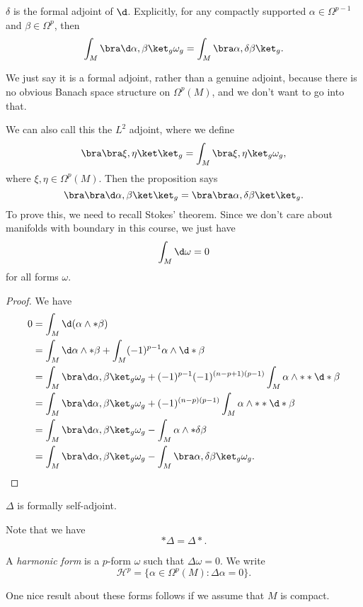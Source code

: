 \documentclass[a4paper]{article}
\begin{document}
\begin{prop}
  $\delta$ is the formal adjoint of $\d$. Explicitly, for any compactly supported $\alpha \in \Omega^{p - 1}$ and $\beta \in \Omega^p$, then
  \[
    \int_M \bra \d \alpha, \beta\ket_g \omega_g = \int_M \bra \alpha, \delta \beta\ket_g.
  \]
\end{prop}
We just say it is a formal adjoint, rather than a genuine adjoint, because there is no obvious Banach space structure on $\Omega^p(M)$, and we don't want to go into that.

We can also call this the $L^2$ adjoint, where we define
\[
  \bra \bra \xi, \eta\ket\ket_g = \int_M \bra \xi, \eta\ket_g \omega_g,
\]
where $\xi, \eta \in \Omega^p(M)$. Then the proposition says
\[
  \bra\bra \d \alpha, \beta\ket\ket_g = \bra \bra \alpha, \delta \beta \ket\ket_g.
\]
To prove this, we need to recall Stokes' theorem. Since we don't care about manifolds with boundary in this course, we just have
\[
  \int_M \d \omega = 0
\]
for all forms $\omega$.
\begin{proof}
  We have
  \begin{align*}
    0 &= \int_M \d (\alpha \wedge *\beta)\\
    &= \int_M \d \alpha \wedge *\beta + \int_M (-1)^{p - 1} \alpha \wedge \d * \beta\\
    &= \int_M \bra \d \alpha, \beta \ket_g \omega_g + (-1)^{p - 1} (-1)^{(n - p + 1)(p - 1)}\int_M \alpha \wedge **\d* \beta\\
    &= \int_M \bra \d \alpha, \beta \ket_g \omega_g + (-1)^{(n - p)(p - 1)} \int_M \alpha \wedge **\d* \beta\\
    &= \int_M \bra \d \alpha, \beta\ket_g \omega_g - \int_M \alpha \wedge * \delta \beta\\
    &= \int_M \bra \d \alpha, \beta\ket_g \omega_g - \int_M \bra \alpha, \delta \beta\ket_g \omega_g.
  \end{align*}
\end{proof}

\begin{cor}
  $\Delta$ is formally self-adjoint.
\end{cor}

Note that we have
\[
  * \Delta = \Delta *.
\]
\begin{defi}
  A \emph{harmonic form} is a $p$-form $\omega$ such that $\Delta \omega = 0$. We write
  \[
    \mathcal{H}^p = \{\alpha \in \Omega^p(M): \Delta \alpha = 0\}.
  \]
\end{defi}
One nice result about these forms follows if we assume that $M$ is compact.
\end{document}
